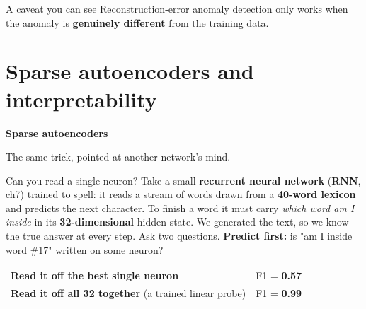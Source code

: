 \documentclass[aspectratio=169]{beamer}
\begin{document}
\begin{frame}{A caveat you can see}
  \small
  Reconstruction-error anomaly detection only works when the anomaly is \textbf{genuinely
  different} from the training data.
  \vskip 6pt
\end{frame}

\section{Sparse autoencoders and interpretability}

\begin{frame}[plain]
  \vfill
  \begin{center}
    {\Large\color{popblue}\textbf{Sparse autoencoders}}\\[0.9em]
    \begin{minipage}{0.82\textwidth}\centering\small
      The same trick, pointed at another network's mind.
    \end{minipage}
  \end{center}
  \vfill
\end{frame}

\begin{frame}{Can you read a single neuron?}
  \small
  Take a small \textbf{recurrent neural network} (\textbf{RNN}, ch7) trained to spell: it reads a
  stream of words drawn from a
  \textbf{40-word lexicon} and predicts the next character. To finish a word it must carry
  \emph{which word am I inside} in its \textbf{32-dimensional} hidden state.
  \vskip 4pt
  We generated the text, so we know the true answer at every step. Ask two questions.
  \vskip 6pt
  \textbf{Predict first:} is "am I inside word \#17" written on some neuron?
  \pause
  \vskip 6pt
  \begin{center}\small
    \begin{tabular}{@{}lc@{}}
      \textbf{Read it off the best single neuron} & F1 = \textbf{0.57}\\
      \textbf{Read it off all 32 together} (a trained linear probe) & F1 = \textbf{0.99}\\
    \end{tabular}
  \end{center}
  \vskip 6pt
\end{frame}
\end{document}
